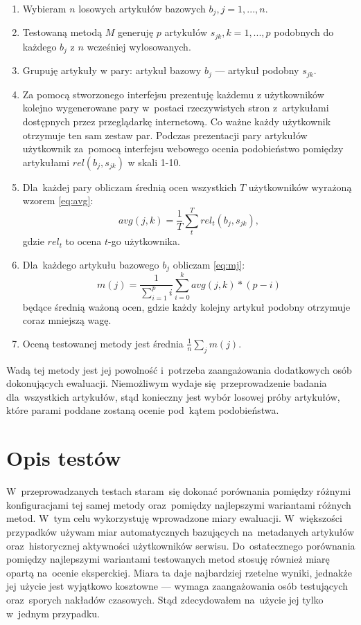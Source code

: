 \documentclass[pl]{minipw} %
\begin{document}
\begin{enumerate}
	\item Wybieram $n$ losowych artykułów bazowych $b_j, j=1,...,n$.
	\item Testowaną metodą $M$ generuję $p$ artykułów $s_{jk}, k=1,...,p$ podobnych do każdego $b_j$ z $n$ wcześniej wylosowanych.
	\item Grupuję artykuły w pary: artykuł bazowy $b_j$ --- artykuł podobny $s_{jk}$.
	\item Za pomocą stworzonego interfejsu prezentuję każdemu z użytkowników kolejno wygenerowane pary w~postaci rzeczywistych stron z~artykułami dostępnych przez przeglądarkę internetową. Co ważne każdy użytkownik otrzymuje ten sam zestaw par. Podczas prezentacji pary artykułów użytkownik za~pomocą interfejsu webowego ocenia podobieństwo pomiędzy artykułami $rel(b_j, s_{jk})$ w skali 1-10.
	\item Dla~każdej pary obliczam średnią ocen wszystkich $T$ użytkowników wyrażoną wzorem \ref{eq:avg}:
	\begin{equation}
	\label{eq:avg}
	avg(j,k)=\frac{1}{T}\sum_{t}^{T}rel_t(b_j, s_{jk}),
	\end{equation}
	gdzie $rel_t$ to ocena $t$-go użytkownika.
	\item Dla~każdego artykułu bazowego $b_j$ obliczam \ref{eq:mj}:
	\begin{equation}
	\label{eq:mj}
	m(j) = \frac{1}{\sum_{i=1}^{p}i}\sum_{i=0}^{k} avg(j,k)*(p-i)
	\end{equation}
	będące średnią ważoną ocen, gdzie każdy kolejny artykuł podobny otrzymuje coraz mniejszą wagę.
	\item Oceną testowanej metody jest średnia $\frac{1}{n}\sum_{j}m(j)$.
\end{enumerate}

Wadą tej metody jest jej powolność i~potrzeba zaangażowania dodatkowych osób dokonujących ewaluacji. Niemożliwym wydaje się~przeprowadzenie badania dla~wszystkich artykułów, stąd konieczny jest wybór losowej próby artykułów, które parami poddane zostaną ocenie pod~kątem podobieństwa.


\chapter{Opis testów}

W~przeprowadzanych testach staram~się dokonać porównania pomiędzy różnymi konfiguracjami tej samej metody oraz~pomiędzy najlepszymi wariantami różnych metod. W~tym celu wykorzystuję wprowadzone miary ewaluacji. W~większości przypadków używam miar automatycznych bazujących na~metadanych artykułów oraz~historycznej aktywności użytkowników serwisu. Do~ostatecznego porównania pomiędzy najlepszymi wariantami testowanych metod stosuję również miarę opartą na~ocenie eksperckiej. Miara ta daje najbardziej rzetelne wyniki, jednakże jej użycie jest wyjątkowo kosztowne --- wymaga zaangażowania osób testujących oraz~sporych nakładów czasowych. Stąd zdecydowałem na~użycie jej tylko w~jednym przypadku.
\end{document}
